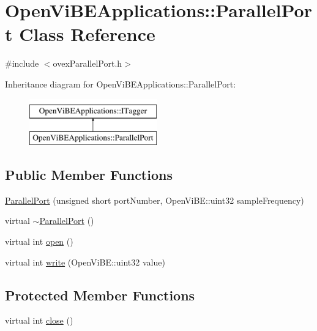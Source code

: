 \hypertarget{classOpenViBEApplications_1_1ParallelPort}{
\section{OpenViBEApplications::ParallelPort Class Reference}
\label{classOpenViBEApplications_1_1ParallelPort}
}


{\ttfamily \#include $<$ovexParallelPort.h$>$}

Inheritance diagram for OpenViBEApplications::ParallelPort:\begin{figure}[H]
\begin{center}
\leavevmode
\includegraphics[height=2.000000cm]{classOpenViBEApplications_1_1ParallelPort}
\end{center}
\end{figure}
\subsection*{Public Member Functions}
\begin{DoxyCompactItemize}
\item 
\hyperlink{classOpenViBEApplications_1_1ParallelPort_a52b975bb6146ad1a8c1d7fbecd78f56d}{ParallelPort} (unsigned short portNumber, OpenViBE::uint32 sampleFrequency)
\item 
virtual \hyperlink{classOpenViBEApplications_1_1ParallelPort_a9240dcdd54bd0fab95879217db1319fd}{$\sim$ParallelPort} ()
\item 
virtual int \hyperlink{classOpenViBEApplications_1_1ParallelPort_a7f06b3db017dc1568e85fe3d01bb0d23}{open} ()
\item 
virtual int \hyperlink{classOpenViBEApplications_1_1ParallelPort_abd46a20029c939020a71b1ab06f310a9}{write} (OpenViBE::uint32 value)
\end{DoxyCompactItemize}
\subsection*{Protected Member Functions}
\begin{DoxyCompactItemize}
\item 
virtual int \hyperlink{classOpenViBEApplications_1_1ParallelPort_ab7e57afe9fbc15fa536aca9094c48c9e}{close} ()
\end{DoxyCompactItemize}

